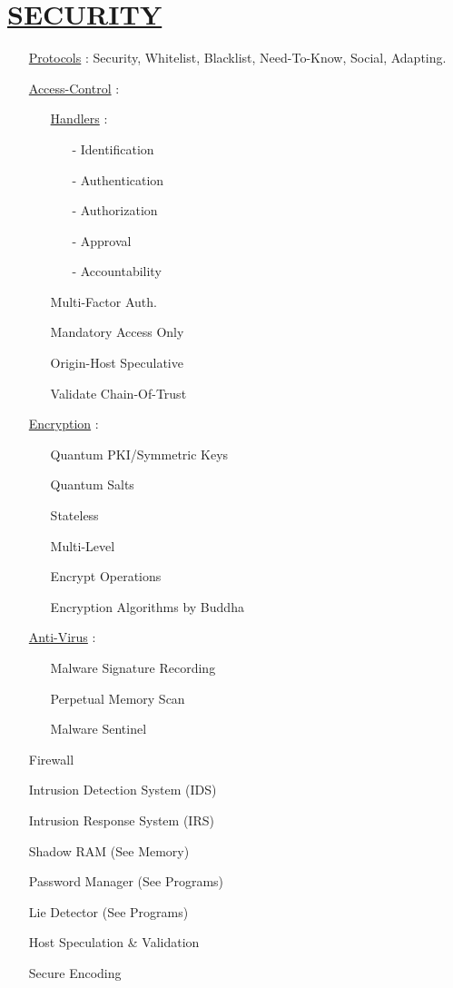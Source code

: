 \documentclass[11pt]{article}
\begin{document}
\section*{\ul{SECURITY}}
\begin{enumerate}
	\item[] \ul{Protocols} : Security, Whitelist, Blacklist, Need-To-Know, Social, Adapting.
	
	\item[] \ul{Access-Control} :
	\begin{enumerate}
		\item[] \ul{Handlers} :
		\begin{enumerate}
			\item[-] Identification
			\item[-] Authentication
			\item[-] Authorization
			\item[-] Approval
			\item[-] Accountability
		\end{enumerate}
	
		\item[] Multi-Factor Auth.
		\item[] Mandatory Access Only
		\item[] Origin-Host Speculative
		\item[] Validate Chain-Of-Trust
		
	\end{enumerate}
	
	\item[] \ul{Encryption} :
	\begin{enumerate}
		\item[] Quantum PKI/Symmetric Keys
		\item[] Quantum Salts
		\item[] Stateless
		\item[] Multi-Level
		\item[] Encrypt Operations
		\item[] Encryption Algorithms by Buddha %
	\end{enumerate}
	
	\item[] \ul{Anti-Virus} :
	\begin{enumerate}
		\item[] Malware Signature Recording
		\item[] Perpetual Memory Scan
		\item[] Malware Sentinel
	\end{enumerate}

	\item[] Firewall
	\item[] Intrusion Detection System (IDS)
	\item[] Intrusion Response System (IRS)
	\item[] Shadow RAM (See Memory)
	\item[] Password Manager (See Programs)
	\item[] Lie Detector (See Programs)
	\item[] Host Speculation \& Validation
	\item[] Secure Encoding
	
\end{enumerate}
\end{document}
